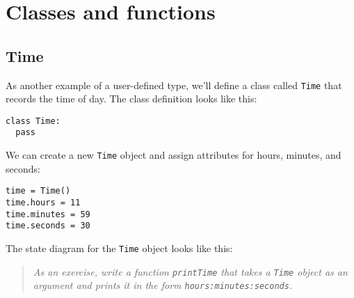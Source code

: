


\chapter{Classes and functions}
\label{time}


\section{Time}

As another example of a user-defined type, we'll define a class called
{\tt Time} that records the time of day.  The class definition looks
like this:

\beforeverb
\begin{verbatim}
class Time:
  pass
\end{verbatim}
\afterverb
%
We can create a new {\tt Time} object and assign
attributes for hours, minutes, and seconds:

\beforeverb
\begin{verbatim}
time = Time()
time.hours = 11
time.minutes = 59
time.seconds = 30
\end{verbatim}
\afterverb
%
The state diagram for the {\tt Time} object looks like this:

\beforefig
\centerline{}
\afterfig

\begin{quote}
{\em As an exercise, write a function {\tt printTime} that takes a 
{\tt Time} object
as an argument and prints it in the form {\tt hours:minutes:seconds}.}
\end{quote}

